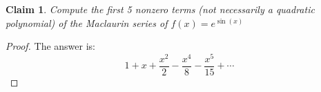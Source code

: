 \documentclass{article}
\newtheorem{theorem}{Claim}
\begin{document}
\begin{theorem}
Compute the first 5 nonzero terms (not necessarily a quadratic polynomial) of the Maclaurin series of $ f(x) = e^{\sin(x)} $
\end{theorem}

\begin{proof}
The answer is:
\[
1+x+\frac{x^2}{2}-\frac{x^4}{8}-\frac{x^5}{15}+\cdots
\]
\end{proof}
\end{document}

